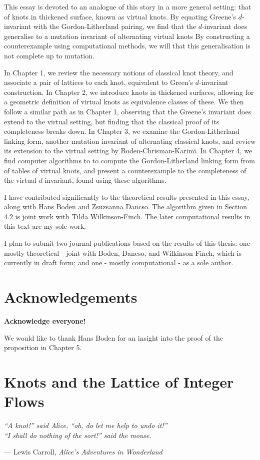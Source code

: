 \documentclass[12pt]{report}
\newcommand{\notered}[1]{{\color{Red} \textbf{#1}}}
\theoremstyle{upright}
\begin{document}
This essay is devoted to an analogue of this story in a more general setting: that of knots in thickened surface, known as virtual knots. By equating Greene's $d$-invariant with the Gordon-Litherland pairing, we find that the $d$-invariant does generalise to a mutation invariant of alternating virtual knots By constructing a counterexample using computational methods, we will that this generalisation is not complete up to mutation.

In Chapter 1, we review the necessary notions of classical knot theory, and associate a pair of lattices to each knot, equivalent to Green's $d$-invariant construction. In Chapter 2, we introduce knots in thickened surfaces, allowing for a geometric definition of virtual knots as equivalence classes of these. We then follow a similar path as in Chapter 1, observing that the Greene's invariant does extend to the virtual setting, but finding that the classical proof of its completeness breaks down. In Chapter 3, we examine the Gordon-Litherland linking form, another mutation invariant of alternating classical knots, and review its extension to the virtual setting by Boden-Chrisman-Karimi. In Chapter 4, we find computer algorithms to to compute the Gordon-Litherland linking form from of tables of virtual knots, and present a counterexample to the completeness of the virtual $d$-invariant, found using these algorithms.

I have contributed significantly to the theoretical results presented in this essay, along with Hans Boden and Zsuzsanna Dancso. The algorithm given in Section 4.2 is joint work with Tilda Wilkinson-Finch. The later computational results in this text are my sole work.

I plan to submit two journal publications based on the results of this thesis: one - mostly theoretical - joint with Boden, Dancso, and Wilkinson-Finch, which is currently in draft form; and one - mostly computational - as a sole author.

\chapter*{Acknowledgements}

\notered{Acknowledge everyone!}

We would like to thank Hans Boden for an insight into the proof of the proposition in Chapter 5.


\chapter{Knots and the Lattice of Integer Flows}
\epigraph{\itshape ``A knot!'' said Alice, ``oh, do let me help to undo it!''\\``I shall do nothing of the sort!'' said the mouse.}{--- Lewis Carroll, \textit{Alice's Adventures in Wonderland}}
\end{document}
